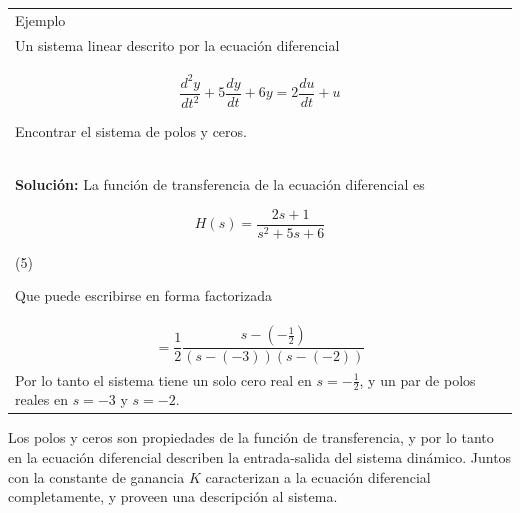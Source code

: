 \documentclass[10pt,a4paper]{article}
\newcommand\tab[1][1cm]{\hspace*{#1}}
\begin{document}
\clearpage
\begin{center}
  \begin{tabular}{p{16cm}}
  \hline
  Ejemplo\\
  Un sistema linear descrito por la ecuación diferencial\\
  \begin{center}
    \[\frac{d^{2}y}{dt^{2}}+5\frac{dy}{dt}+6y=2\frac{du}{dt}+u\]
  \end{center}
  Encontrar el sistema de polos y ceros.\\
  \textbf{Solución:} La función de transferencia de la ecuación diferencial es
  \begin{center}
    \[H(s)=\frac{2s+1}{s^{2}+5s+6}\]
  \end{center}
  \begin{minipage}{0.9\textwidth}
    \begin{flushright}
        (5)
    \end{flushright}
  \end{minipage}
  Que puede escribirse en forma factorizada
  \begin{center}
    \[H(s)=\frac{1}{2}\frac{s+\frac{1}{2}}{(s+3)(s+2)}\]\\
    \tab\hspace{0.7cm}\[=\frac{1}{2}\frac{s-(-\frac{1}{2})}{(s-(-3))(s-(-2))}\]
  \end{center}
  \begin{minipage}{0.9\textwidth}
    \begin{flushright}
        (6)
    \end{flushright}
  \end{minipage}
  \\Por lo tanto el sistema tiene un solo cero real en $s=-\frac{1}{2}$, y un par de polos reales en $s=-3$ y $s=-2$.\\
  \hline
  \end{tabular}
\end{center}
Los polos y ceros son propiedades de la función de transferencia, y por lo tanto en la ecuación diferencial describen la entrada-salida  del sistema dinámico. Juntos con la constante de ganancia $K$ caracterizan a la ecuación diferencial completamente, y proveen una descripción al sistema.
\end{document}
